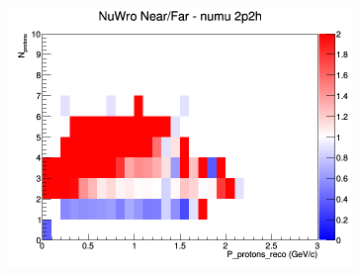 \documentclass[12pt]{article}
\begin{document}
\begin{figure}[h]
\begin{subfigure}[b]{0.32\textwidth}
\includegraphics[width=\linewidth]{eff_N_P/GAr/protons/ratios/2p2h_NuWro_numu_NF_N_P.png}
\end{subfigure}


\end{figure}
\end{document}
